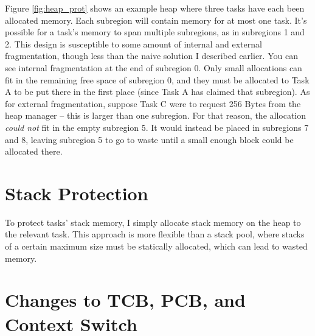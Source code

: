 Figure \ref{fig:heap_prot} shows an example heap where three tasks have each been allocated memory. Each subregion will contain memory for at most one task. It's possible for a task's memory to span multiple subregions, as in subregions 1 and 2. This design is susceptible to some amount of internal and external fragmentation, though less than the naive solution I described earlier. You can see internal fragmentation at the end of subregion 0. Only small allocations can fit in the remaining free space of subregion 0, and they must be allocated to Task A to be put there in the first place (since Task A has claimed that subregion). As for external fragmentation, suppose Task C were to request 256 Bytes from the heap manager -- this is larger than one subregion. For that reason, the allocation \textit{could not} fit in the empty subregion 5. It would instead be placed in subregions 7 and 8, leaving subregion 5 to go to waste until a small enough block could be allocated there.

\section{Stack Protection}

To protect tasks' stack memory, I simply allocate stack memory on the heap to the relevant task. This approach is more flexible than a stack pool, where stacks of a certain maximum size must be statically allocated, which can lead to wasted memory.

\section{Changes to TCB, PCB, and Context Switch}


